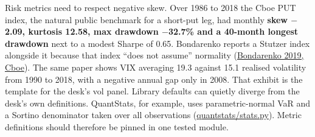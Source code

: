 \documentclass{article}
\begin{document}
Risk metrics need to respect negative skew. Over 1986 to 2018 the Cboe PUT index, the natural public benchmark for a short-put leg, had monthly \textbf{skew \ensuremath{-}2.09, kurtosis 12.58, max drawdown \ensuremath{-}32.7\% and a 40-month longest drawdown} next to a modest Sharpe of 0.65. Bondarenko reports a Stutzer index alongside it because that index ``does not assume'' normality (\href{https://cdn.cboe.com/resources/education/research_publications/PutWriteCBOE19_v14_by_Prof_Oleg_Bondarenko_as_of_June_14.pdf}{Bondarenko 2019, Cboe}). The same paper shows VIX averaging 19.3 against 15.1 realised volatility from 1990 to 2018, with a negative annual gap only in 2008. That exhibit is the template for the desk's vol panel. Library defaults can quietly diverge from the desk's own definitions. QuantStats, for example, uses parametric-normal VaR and a Sortino denominator taken over all observations (\href{https://raw.githubusercontent.com/ranaroussi/quantstats/main/quantstats/stats.py}{quantstats/\allowbreak{}stats.py}). Metric definitions should therefore be pinned in one tested module.
\end{document}
